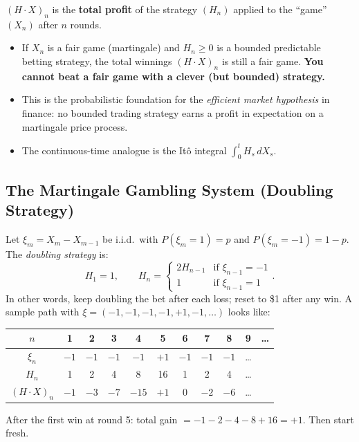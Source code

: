 \documentclass[12pt]{article}
\newcommand{\1}{\mathbf{1}}
\begin{document}
\begin{tcolorbox}[bluebox={Intuition: Martingale Transform as Cumulative Winnings}]
$(H \cdot X)_n$ is the \textbf{total profit} of the strategy $(H_n)$ applied to the
``game'' $(X_n)$ after $n$ rounds.
\begin{itemize}
  \item If $X_n$ is a fair game (martingale) and $H_n \ge 0$ is a bounded predictable
        betting strategy, the total winnings $(H \cdot X)_n$ is still a fair game.
        \textbf{You cannot beat a fair game with a clever (but bounded) strategy.}
  \item This is the probabilistic foundation for the \emph{efficient market hypothesis}
        in finance: no bounded trading strategy earns a profit in expectation on a
        martingale price process.
  \item The continuous-time analogue is the It\^o integral $\int_0^t H_s\,dX_s$.
\end{itemize}
\end{tcolorbox}

\subsection{The Martingale Gambling System (Doubling Strategy)}

\begin{tcolorbox}[redbox={Example: Martingale Doubling System}]
Let $\xi_m = X_m - X_{m-1}$ be i.i.d.\ with $P(\xi_m = 1) = p$ and
$P(\xi_m = -1) = 1-p$.  The \emph{doubling strategy} is:
\[
  H_1 = 1, \qquad
  H_n = \begin{cases} 2H_{n-1} & \text{if } \xi_{n-1} = -1 \\ 1 & \text{if } \xi_{n-1} = 1 \end{cases}.
\]
In other words, keep doubling the bet after each loss; reset to \$1 after any win.
A sample path with $\xi = (-1,-1,-1,-1,+1,-1,\ldots)$ looks like:

\medskip
\begin{center}
\begin{tabular}{c|cccccccccc}
$n$                & 1  & 2  & 3  & 4   & 5   & 6 & 7 & 8 & 9  & \ldots\\
\hline
$\xi_n$            & $-1$ & $-1$ & $-1$ & $-1$ & $+1$ & $-1$ & $-1$ & $-1$ & \ldots\\
$H_n$              & 1  & 2  & 4  & 8   & 16  & 1 & 2 & 4 & \ldots\\
$(H\cdot X)_n$     & $-1$ & $-3$ & $-7$ & $-15$ & $+1$ & $0$ & $-2$ & $-6$ & \ldots\\
\end{tabular}
\end{center}
\medskip
After the first win at round 5: total gain $= -1-2-4-8+16 = +1$.  Then start fresh.
\end{tcolorbox}
\end{document}

